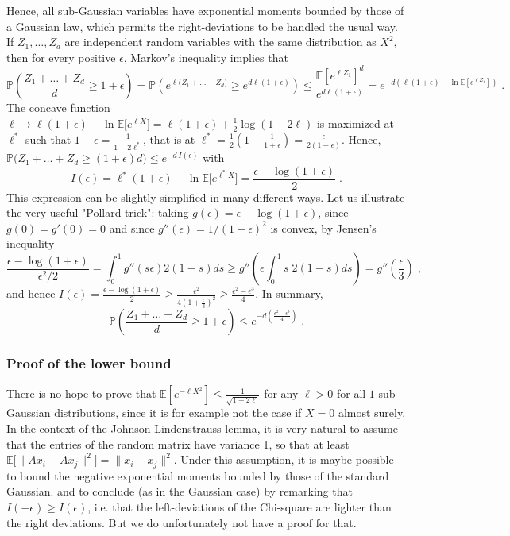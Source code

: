 \documentclass{ps}
\renewcommand{\P}{\mathbb{P}}
\newcommand{\E}{\mathbb{E}}
\newcommand{\1}{\mathbbm{1}}
\theoremstyle{plain}
\begin{document}
Hence, all sub-Gaussian variables have exponential moments bounded by those of a Gaussian law, which permits the right-deviations to be handled the usual way. 
If $Z_1,\dots,Z_d$ are independent random variables with the same distribution as $X^2$, then  for every positive $\epsilon$, Markov's inequality implies that 
\[\P\left(\frac{Z_1+\dots+Z_d}{d}\geq 1+\epsilon\right) = \P\left(e^{\ell\big(Z_1+\dots+Z_d\big)}\geq e^{d\ell(1+\epsilon)}\right) \leq \frac{\E[e^{\ell Z_1}]^d}{e^{d\ell(1+\epsilon)}} =  e^{-d \left(\ell (1+\epsilon) - \ln \E\left[e^{\ell Z_1}\right]\right)}\;.\]
The concave function $\ell\mapsto \ell (1+\epsilon) -\ln \E\big[e^{\ell X}\big] = \ell (1+\epsilon) + \frac{1}{2}\log(1-2\ell)$ is maximized at $\ell^*$ such that $1+\epsilon=\frac{1}{1-2\ell^*}$, that is at $\ell^*=\frac{1}{2}\left(1-\frac{1}{1+\epsilon}\right)=\frac{\epsilon}{2(1+\epsilon)}$. Hence, 
$\P\big(Z_1+\dots+Z_d \geq (1+\epsilon)d\big) \leq e^{-d\,I(\epsilon)}$ with 
\[I(\epsilon) = \ell^*(1+\epsilon)-\ln \E\big[e^{\ell^* X}\big] = \frac{\epsilon-\log(1+\epsilon)}{2}\;. \] 
This expression can be slightly simplified in many different ways. Let us illustrate the very useful "Pollard trick": taking $g(\epsilon)=\epsilon-\log(1+\epsilon)$, since $g(0)=g'(0)=0$  and since $g''(\epsilon)=1/(1+\epsilon)^2$ is convex, by Jensen's inequality
\[\frac{\epsilon-\log(1+\epsilon)}{\epsilon^2/2} = \int_{0}^1 g''(s\epsilon) 2(1-s)ds \geq g''\left(\epsilon\int_{0}^1 s\; 2(1-s)ds\right) = g''\left(\frac{\epsilon}{3}\right)\;,\]
and hence $\displaystyle{I(\epsilon) =\frac{\epsilon-\log(1+\epsilon)}{2} \geq \frac{\epsilon^2}{4\left(1+\frac{\epsilon}{3}\right)^2}} \geq \frac{\epsilon^2 - \epsilon^3}{4} $.
In summary, 
\begin{equation}\label{eq:chernoffUB}\P\left(\frac{Z_1+\dots+Z_d}{d}\geq 1+\epsilon\right)\leq 
	e^{-d\left(\frac{\epsilon^2 - \epsilon^3}{4} \right)} 
	\;.\end{equation}

\subsubsection{Proof of the lower bound}\label{subsec:LB}
There is no hope to prove  that $\E\left[e^{-\ell X^2}\right] \leq \frac{1}{\sqrt{1+2\ell}}$  for any $\ell>0$ for all $1$-sub-Gaussian distributions, since it is for example not the case if $X=0$ almost surely.
In the context of the Johnson-Lindenstrauss lemma, it is very natural to assume that the entries of the random matrix have variance 1, so that at least $\E\big[\|Ax_i-Ax_j\|^2\big] = \|x_i-x_j\|^2 $.
Under this assumption, it is maybe possible to bound the  negative exponential moments bounded by those of the standard Gaussian. 
and to conclude (as in the Gaussian case) by remarking that $I(-\epsilon) \geq I(\epsilon)$, i.e. that the left-deviations of the Chi-square are lighter than the right deviations. But we do unfortunately not have a proof for that. 
\end{document}
